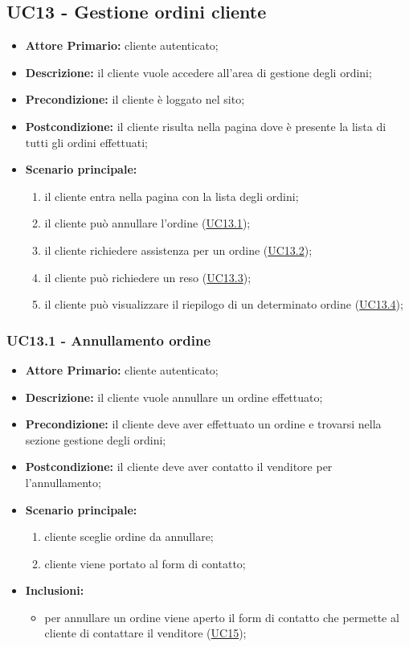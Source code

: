 \subsection{UC13 - Gestione ordini cliente}
\label{UC13}
\begin{itemize}
    \item \textbf{Attore Primario:} cliente autenticato;
    \item \textbf{Descrizione:} il cliente vuole accedere all'area di gestione degli ordini;
    \item \textbf{Precondizione:} il cliente è loggato nel sito;
    \item \textbf{Postcondizione:} il cliente risulta nella pagina dove è presente la lista di tutti gli ordini effettuati;
    \item \textbf{Scenario principale:}
    \begin{enumerate}
        \item il cliente entra nella pagina con la lista degli ordini;
        \item il cliente può annullare l'ordine (\hyperref[UC13.1]{UC13.1});
        \item il cliente richiedere assistenza per un ordine (\hyperref[UC13.2]{UC13.2});
        \item il cliente può richiedere un reso (\hyperref[UC13.3]{UC13.3});
        \item il cliente può visualizzare il riepilogo di un determinato ordine (\hyperref[UC13.4]{UC13.4});
    \end{enumerate}
\end{itemize}

\subsubsection{UC13.1 - Annullamento ordine}
\label{UC13.1}
\begin{itemize}
\item \textbf{Attore Primario:} cliente autenticato;
\item \textbf{Descrizione:} il cliente vuole annullare un ordine effettuato;
\item \textbf{Precondizione:} il cliente deve aver effettuato un ordine e trovarsi nella sezione gestione degli ordini;
\item \textbf{Postcondizione:} il cliente deve aver contatto il venditore per l'annullamento;
\item \textbf{Scenario principale:}
\begin{enumerate}
    \item cliente sceglie ordine da annullare;
    \item cliente viene portato al form di contatto;
\end{enumerate}
\item \textbf{Inclusioni:}
\begin{itemize}
    \item per annullare un ordine viene aperto il form di contatto che permette al cliente di contattare il venditore (\hyperref[UC15]{UC15});
\end{itemize}
\end{itemize}

